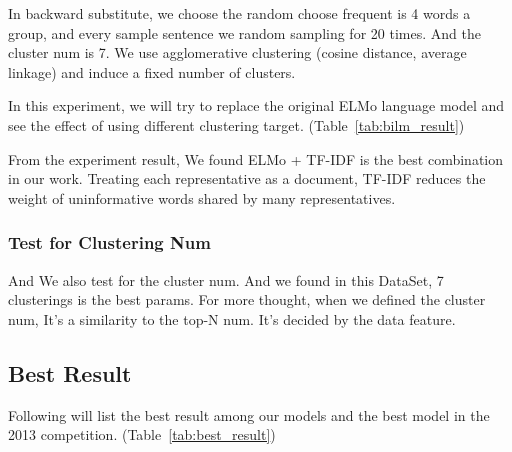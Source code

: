 In backward substitute, we choose the random choose frequent is 4 words a group, and every sample sentence we random sampling for  20 times.
And the cluster num is 7.
We use agglomerative clustering (cosine distance, average linkage) and induce a fixed number of clusters.

In this experiment, we will try to replace the original ELMo language model and see the effect of using different clustering target. (Table~\ref{tab:bilm_result})



From the experiment result, We found ELMo + TF-IDF is the best combination in our work.
Treating each representative as a document, TF-IDF reduces the weight of uninformative words shared by many representatives.


\subsubsection*{Test for Clustering Num}



And We also test for the cluster num.
And we found in this DataSet, 7 clusterings is the best params.
For more thought, when we defined the cluster num, It's a similarity to the top-N num.
It's decided by the data feature.

\subsection*{Best Result}

Following will list the best result among our models and the best model in the 2013 competition. (Table~\ref{tab:best_result})



